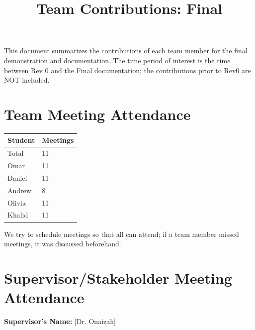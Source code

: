 \documentclass{article}
\title{Team Contributions: Final\\\progname}
\author{\authname}
\date{}
\begin{document}
\maketitle

This document summarizes the contributions of each team member for the final
demonstration and documentation.  The time period of interest is the time
between Rev 0 and the Final documentation; the contributions prior to Rev0 are
NOT included.

\section{Team Meeting Attendance}

\begin{table}[H]
\centering
\begin{tabular}{ll}
\toprule
\textbf{Student} & \textbf{Meetings}\\
\midrule
Total & 11\\
Omar & 11\\
Daniel & 11\\
Andrew & 8\\
Olivia & 11\\
Khalid & 11\\
\bottomrule
\end{tabular}
\end{table}

We try to schedule meetings so that all can attend; if a team member missed meetings, it was discussed beforehand.

\section{Supervisor/Stakeholder Meeting Attendance}

\noindent \textbf{Supervisor's Name: } [Dr. Onaizah]
\end{document}
